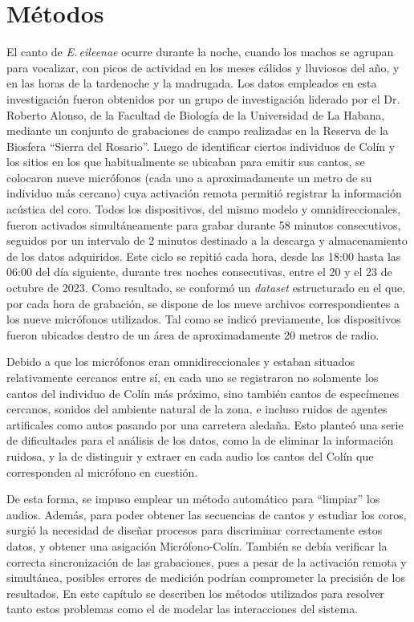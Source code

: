 \chapter{Métodos}\label{chapter:Methods}


El canto de \emph{E.\,eileenae} ocurre durante la noche, 
cuando los machos se agrupan para vocalizar, con picos de 
actividad en los meses cálidos y lluviosos del año, y en las
horas de la tardenoche y la madrugada. Los datos empleados en 
esta investigación fueron obtenidos por un grupo de 
investigación liderado por el Dr. Roberto Alonso, de la 
Facultad de Biología de la Universidad de La Habana, mediante 
un conjunto de grabaciones de campo realizadas en la Reserva 
de la Biosfera “Sierra del Rosario”. Luego de identificar 
ciertos individuos de Colín y los sitios en los que 
habitualmente se ubicaban para emitir sus cantos, se 
colocaron nueve micrófonos (cada uno a aproximadamente un 
metro de su individuo más cercano) cuya activación remota 
permitió registrar la información acústica del coro. Todos los 
dispositivos, del mismo modelo y omnidireccionales, 
fueron activados simultáneamente para grabar durante 58 minutos 
consecutivos, seguidos por un intervalo de 2 minutos destinado a 
la descarga y almacenamiento de los datos adquiridos. Este 
ciclo se repitió cada hora, desde las 18:00 hasta las 06:00 
del día siguiente, durante tres noches consecutivas, entre el 
20 y el 23 de octubre de 2023. Como resultado, se conformó un 
\textit{dataset} estructurado en el que, por cada hora de 
grabación, se dispone de los nueve archivos correspondientes a 
los nueve micrófonos utilizados. Tal como se indicó 
previamente, los dispositivos fueron ubicados dentro de un 
área de aproximadamente 20 metros de radio.



Debido a que los micrófonos eran omnidireccionales y estaban situados 
relativamente cercanos entre sí, en cada uno se registraron no solamente
los cantos del individuo de Colín más próximo, sino también cantos de especímenes
cercanos, sonidos del ambiente natural de la zona, e incluso ruidos de 
agentes artificales como autos pasando por una carretera aledaña.
Esto planteó una serie de dificultades para el análisis de los datos,
como la de eliminar la información ruidosa, y la de distinguir y extraer
en cada audio los cantos del Colín que corresponden al micrófono en cuestión. 

De esta forma, se impuso emplear un método automático para “limpiar” los audios.
Además, para poder obtener las secuencias de cantos y estudiar los coros,
surgió la necesidad de diseñar procesos para discriminar correctamente
estos datos, y obtener una asigación Micrófono-Colín.   
También se debía verificar la correcta sincronización de las grabaciones,
pues a pesar de la activación remota y simultánea, posibles errores de medición
podrían comprometer la precisión de los resultados. En este capítulo
se describen los métodos utilizados para resolver tanto estos problemas
como el de modelar las interacciones del sistema. 

